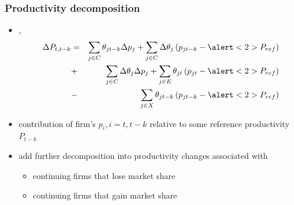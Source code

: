 \begin{slide}
\frametitle{Productivity decomposition}
  \begin{itemize}[<+->]

\item \citet{Bailyandal:1992}, \citet{Fosterandal:2001} 
\begin{eqnarray}
\label{eq:fhk_decomposition}
\label{eq:FHC}
\Delta P_{t,t-k} & = & \sum_{j \in C} \theta_{jt-k} \Delta p_{j} 
	              +  \sum_{j \in C} \Delta \theta_{j} \left (p_{jt-k} - \alert<2>{P_{ref}} \right) \nonumber\\
	             & + & \sum_{j \in C} \Delta \theta_{j} \Delta p_{j}  
	              +  \sum_{j \in E} \theta_{jt} \left( p_{jt} - \alert<2>{P_{ref}} \right) \nonumber\\
	             & - & \sum_{j \in X} \theta_{jt-k} \left( p_{jt-k} - \alert<2>{P_{ref}}\right)\nonumber
\end{eqnarray}
\item contribution of firm's $p_i, i=t,t-k$ relative to some reference productivity  \alert<2>{$P_{t-k}$}
\item \citet{BaldwinGu2006,BaldwinGu2008} add further decomposition into productivity changes associated with 
\begin{itemize}
\item continuing firms that lose market share
\item continuing firms that gain market share
\end{itemize}
 \end{itemize}
\end{slide}




